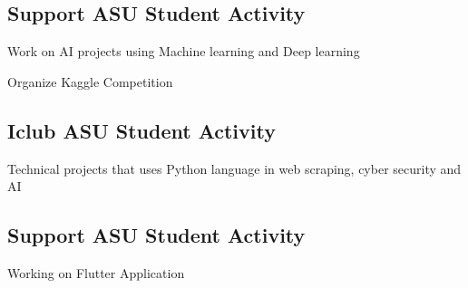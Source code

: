 \documentclass[letter,10pt]{article}
\begin{document}
\subsection{{Support ASU  Student Activity }}
\begin{zitemize}
\item Work on AI projects using Machine learning and Deep learning
\item Organize Kaggle Competition

\end{zitemize}


\subsection{{Iclub ASU  Student Activity }}
\begin{zitemize}
\item Technical projects that uses Python language in web scraping, cyber security and AI  
\end{zitemize}

\subsection{{Support ASU  Student Activity }}
\begin{zitemize}
\item Working on Flutter Application 
\end{zitemize}

\end{document}
